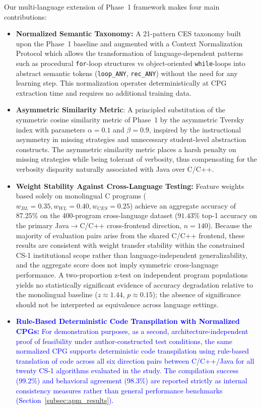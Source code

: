 Our multi-language extension of Phase~1 framework makes four main contributions:
\begin{itemize}
    \item \textbf{Normalized Semantic Taxonomy:} A 21-pattern CES taxonomy built upon the Phase~1 baseline and augmented with a Context Normalization Protocol which allows the transformation of language-dependent patterns such as procedural \texttt{for}-loop structures vs object-oriented \texttt{while}-loops into abstract semantic tokens (\texttt{loop\_ANY}, \texttt{rec\_ANY}) without the need for any learning step. This normalization operates deterministically at CPG extraction time and requires no additional training data.
    \item \textbf{Asymmetric Similarity Metric}: A principled substitution of the symmetric cosine similarity metric of Phase~1 by the asymmetric Tversky index with parameters $\alpha{=}0.1$ and $\beta{=}0.9$, inspired by the instructional asymmetry in missing strategies and unnecessary student-level abstraction constructs. The asymmetric similarity metric places a harsh penalty on missing strategies while being tolerant of verbosity, thus compensating for the verbosity disparity naturally associated with Java over C/C++.
    \item \textbf{Weight Stability Against Cross-Language Testing:} Feature weights based solely on monolingual C programs ($w_{BL}=0.35, w_{WL}=0.40, w_{CES}=0.25$) achieve an aggregate accuracy of 87.25\% on the 400-program cross-language dataset ($91.43\%$ top-1 accuracy on the primary Java$\rightarrow$C/C++ cross-frontend direction, $n=140$). Because the majority of evaluation pairs arise from the shared C/C++ frontend, these results are consistent with weight transfer stability within the constrained CS-1 institutional scope rather than language-independent generalizability, and the aggregate score does not imply symmetric cross-language performance. A two-proportion z-test on independent program populations yields no statistically significant evidence of accuracy degradation relative to the monolingual baseline ($z \approx 1.44$, $p \approx 0.15$); the absence of significance should not be interpreted as equivalence across language settings.
    \item \textcolor{blue}{\textbf{Rule-Based Deterministic Code Transpilation with Normalized CPGs:} For demonstration purposes, as a second, architecture-independent proof of feasibility under author-constructed test conditions, the same normalized CPG supports deterministic code transpilation using rule-based translation of code across all six direction pairs between C/C++/Java for all twenty CS-1 algorithms evaluated in the study. The compilation success (99.2\%) and behavioral agreement (98.3\%) are reported strictly as internal consistency measures rather than general performance benchmarks (Section~\ref{subsec:apm_results}).}
\end{itemize}

